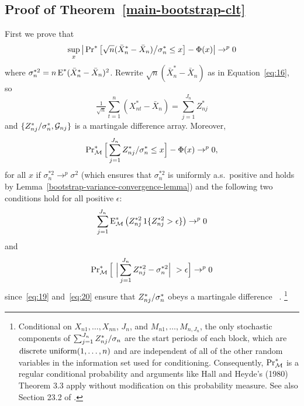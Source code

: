 \documentclass[11pt]{article}
\begin{document}
\subsection*{Proof of Theorem~\ref{main-bootstrap-clt}}
{%
\newcommand{\Db}[1][j]{D_{n#1}^{*}}
\newcommand{\Zsum}{\sum_{j=1}^{J_n} \Zb / \sigma_n}
First we prove that
\begin{equation}\label{eq:37}
  \sup_x \big\lvert \operatorname{Pr}^{*}\big[
  \sqrt{n}(\bar X_{n}^{*} -  \bar X_n) \big/ \sigma_n^{*}
  \leq x \big] - \Phi(x) \big\rvert \to^p 0
\end{equation}
where $\sigma_n^{*2} = n \operatorname{E}^* (\bar X_n^* - \bar X_n)^2$.
Rewrite $\sqrt{n}(\bar X_{n}^{*} - \bar X_n)$ as in
Equation~\eqref{eq:16}, so
\begin{equation*}
  \tfrac{1}{\sqrt{n}} \sum_{t=1}^n (X_{nt}^* - \bar X_n) =
  \sum_{j=1}^{J_n} Z_{nj}^*
\end{equation*}
and $\{{Z^*_{n{j}}} / \sigma_n^*, \mathcal{G}_{nj}\}$ is a martingale difference
array. Moreover,
\begin{equation}
  \label{eq:18}
  \operatorname{Pr}_{\mathcal{M}}^{*} \Big[\sum_{j=1}^{J_n} {Z^*_{n{j}}} / \sigma_n^* \leq x \Big] - \Phi(x) \to^p 0,
\end{equation}
for all $x$ if $\sigma_n^{*2} \to^p \sigma^2$ (which ensures that
$\sigma_n^{*2}$ is uniformly a.s.\ positive and holds by
Lemma~\ref{bootstrap-variance-convergence-lemma}) and the following
two conditions hold for all positive $\epsilon$:
\begin{equation}
  \label{eq:19}
  \sum_{j=1}^{J_n} \operatorname{E}_{\mathcal{M}}^{*} \big(Z_{nj}^{*2} \operatorname{1}\{Z_{nj}^{*2}  >
  \epsilon\}\big) \to^p 0
\end{equation}
and
\begin{equation}
  \label{eq:20}
  \operatorname{Pr}_{\mathcal{M}}^{*}\Big[\ \Big|\sum_{j=1}^{J_n} Z_{nj}^{*2} - \sigma_n^{*2}
  \Big|\ > \epsilon \Big] \to^p 0
\end{equation}
since~\eqref{eq:19} and~\eqref{eq:20} ensure that ${Z^*_{n{j}}}/\sigma_n^*$ obeys
a martingale difference \clt\ \citep[e.g.][Theorem 3.3]{HaH:80}.%
\footnote{Conditional on $X_{n1},\dots,X_{nn}$, $J_n$, and
  $M_{n1},\dots,M_{n,J_n}$, the only stochastic components of $\Zsum$
  are the start periods of each block, which are
  $\operatorname{discrete\ uniform}(1,\dots,n)$ and are independent of all of the
  other random variables in the information set used for conditioning.
  Consequently, $\operatorname{Pr}_{\mathcal{M}}^*$ is a regular conditional probability and
  arguments like Hall and Heyde's (1980) Theorem 3.3
  apply without modification on this probability measure. See
  also Section 23.2 of \citet{Vaa:00}.

}}
\end{document}
